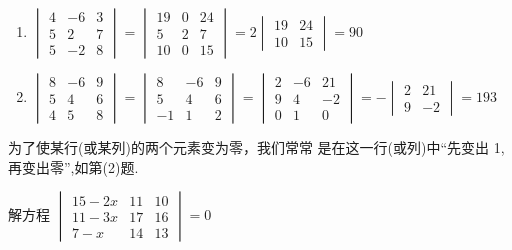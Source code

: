 \begin{solution}
\begin{enumerate}[(1)]
  \item $\begin{vmatrix}4&-6&3\\5&2&7\\5&-2&8\end{vmatrix}=\begin{vmatrix}19&0&24\\5&2&7\\10&0&15\end{vmatrix}=2\begin{vmatrix}19&24\\10&15\end{vmatrix}=90$
  \item $\begin{vmatrix}8&-6&9\\5&4&6\\4&5&8\end{vmatrix}=\begin{vmatrix}8&-6&9\\5&4&6\\-1&1&2\end{vmatrix}=\begin{vmatrix}2&-6&21\\9&4&-2\\0&1&0\end{vmatrix}=-\begin{vmatrix}2&21\\9&-2\end{vmatrix}=193$
\end{enumerate}
\end{solution}

\begin{rmk}
  为了使某行(或某列)的两个元素变为零，我们常常
是在这一行(或列)中“先变出 1,再变出零”,如第(2)题.
\end{rmk}

\begin{example}
  解方程
$\begin{vmatrix}15-2x&11&10\\11-3x&17&16\\7-x&14&13\end{vmatrix}=0$
\end{example}

